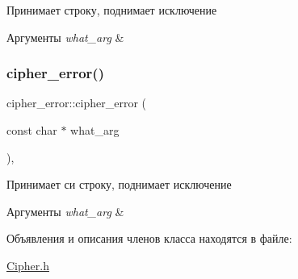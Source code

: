 Принимает строку, поднимает исключение 


\begin{DoxyParams}{Аргументы}
{\em what\+\_\+arg} & \\
\hline
\end{DoxyParams}
\mbox{\label{classcipher__error_a18cf27d9c2cd2538d3cb8f17e9a55f3e}} 
\subsubsection{\texorpdfstring{cipher\+\_\+error()}{cipher\_error()}\hspace{0.1cm}{\footnotesize\ttfamily [2/2]}}
{\footnotesize\ttfamily cipher\+\_\+error\+::cipher\+\_\+error (\begin{DoxyParamCaption}\item[{const char $\ast$}]{what\+\_\+arg }\end{DoxyParamCaption})\hspace{0.3cm}{\ttfamily [inline]}, {\ttfamily [explicit]}}



Принимает си строку, поднимает исключение 


\begin{DoxyParams}{Аргументы}
{\em what\+\_\+arg} & \\
\hline
\end{DoxyParams}


Объявления и описания членов класса находятся в файле\+:\begin{DoxyCompactItemize}
\item 
\hyperlink{Cipher_8h}{Cipher.\+h}\end{DoxyCompactItemize}
